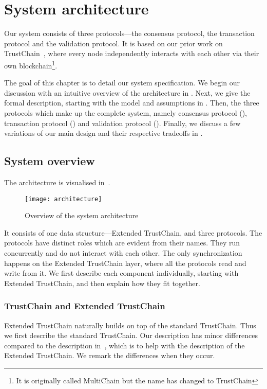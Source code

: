 \chapter{System architecture}
\label{ch:model}

Our system consists of three protocols---the consensus protocol, the transaction protocol and the validation protocol.
It is based on our prior work on TrustChain~\cite{multichain},
where every node independently interacts with each other via their own blockchain\footnote{It is originally called MultiChain but the name has changed to TrustChain}.

The goal of this chapter is to detail our system specification.
We begin our discussion with an intuitive overview of the architecture in .
Next, we give the formal description, starting with the model and assumptions in .
Then, the three protocols which make up the complete system,
namely consensus protocol (), transaction protocol () and validation protocol ().
Finally, we discuss a few variations of our main design and their respective tradeoffs in .

\section{System overview}
\label{sec:system-overview}
The architecture is visualised in~.
\begin{figure}[h]
\centering
\texttt{[image: architecture]}
\caption{Overview of the system architecture}
\label{fig:architecture}
\end{figure}
It consists of one data structure---Extended TrustChain, and three protocols.
The protocols have distinct roles which are evident from their names.
They run concurrently and do not interact with each other.
The only synchronization happens on the Extended TrustChain layer, where all the protocols read and write from it.
We first describe each component individually, starting with Extended TrustChain, and then explain how they fit together.

\subsection*{TrustChain and Extended TrustChain}
Extended TrustChain naturally builds on top of the standard TrustChain. 
Thus we first describe the standard TrustChain.
Our description has minor differences compared to the description in~\cite{multichain},
which is to help with the description of the Extended TrustChain.
We remark the differences when they occur.


